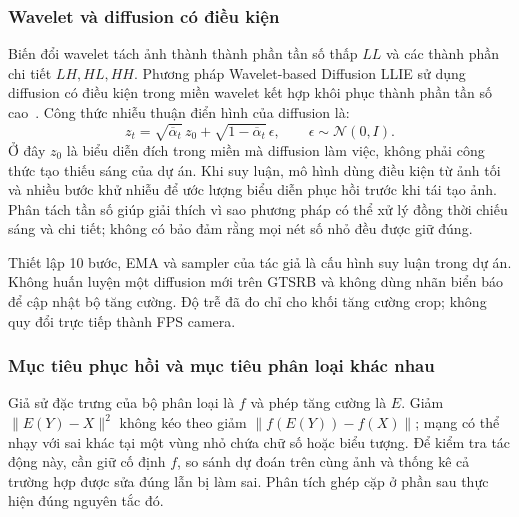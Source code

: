 \subsubsection{Wavelet và diffusion có điều kiện}
Biến đổi wavelet tách ảnh thành thành phần tần số thấp $LL$ và các thành phần chi tiết $LH,HL,HH$. Phương pháp Wavelet-based Diffusion LLIE sử dụng diffusion có điều kiện trong miền wavelet kết hợp khôi phục thành phần tần số cao~\cite{diffusion}. Công thức nhiễu thuận điển hình của diffusion là:
\begin{equation}
z_t=\sqrt{\overline{\alpha}_t}\,z_0+
\sqrt{1-\overline{\alpha}_t}\,\epsilon,\qquad \epsilon\sim\mathcal{N}(0,I).
\end{equation}
Ở đây $z_0$ là biểu diễn đích trong miền mà diffusion làm việc, không phải công thức tạo thiếu sáng của dự án. Khi suy luận, mô hình dùng điều kiện từ ảnh tối và nhiều bước khử nhiễu để ước lượng biểu diễn phục hồi trước khi tái tạo ảnh. Phân tách tần số giúp giải thích vì sao phương pháp có thể xử lý đồng thời chiếu sáng và chi tiết; không có bảo đảm rằng mọi nét số nhỏ đều được giữ đúng.

Thiết lập 10 bước, EMA và sampler của tác giả là cấu hình suy luận trong dự án. Không huấn luyện một diffusion mới trên GTSRB và không dùng nhãn biển báo để cập nhật bộ tăng cường. Độ trễ đã đo chỉ cho khối tăng cường crop; không quy đổi trực tiếp thành FPS camera.

\subsubsection{Mục tiêu phục hồi và mục tiêu phân loại khác nhau}
Giả sử đặc trưng của bộ phân loại là $f$ và phép tăng cường là $E$. Giảm $\|E(Y)-X\|^2$ không kéo theo giảm $\|f(E(Y))-f(X)\|$; mạng có thể nhạy với sai khác tại một vùng nhỏ chứa chữ số hoặc biểu tượng. Để kiểm tra tác động này, cần giữ cố định $f$, so sánh dự đoán trên cùng ảnh và thống kê cả trường hợp được sửa đúng lẫn bị làm sai. Phân tích ghép cặp ở phần sau thực hiện đúng nguyên tắc đó.
